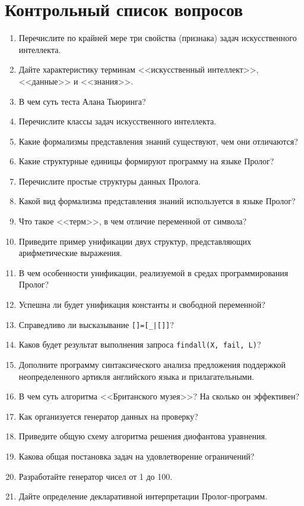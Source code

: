 \documentclass[12pt, openany, twoside]{book} %
\begin{document}
\chapter*{Контрольный список вопросов}
\begin{enumerate}
\item{} Перечислите по крайней мере три свойства (признака) задач искусственного интеллекта.
\item{} Дайте характеристику терминам <<искусственный интеллект>>, <<данные>> и <<знания>>.
\item{} В чем суть теста Алана Тьюринга?
\item{} Перечислите классы задач искусственного интеллекта.
\item{} Какие формализмы представления знаний существуют, чем они отличаются?
\item{} Какие структурные единицы формируют программу на языке Пролог?
\item{} Перечислите простые структуры данных Пролога.
\item{} Какой вид формализма представления знаний используется в языке Пролог?
\item{} Что такое <<терм>>, в чем отличие переменной от символа?
\item{} Приведите пример унификации двух структур, представляющих арифметические выражения.
\item{} В чем особенности унификации, реализуемой в средах программирования Пролог?
\item{} Успешна ли будет унификация константы и свободной переменной?
\item{} Справедливо ли высказывание \texttt{[]=[\_|[]]}?
\item{} Каков будет результат выполнения запроса \texttt{findall(X, fail, L)}?
\item{} Дополните программу синтаксического анализа предложения поддержкой неопределенного артикля английского языка и прилагательными.
\item{} В чем суть алгоритма <<Британского музея>>? На сколько он эффективен?
\item{} Как организуется генератор данных на проверку?
\item{} Приведите общую схему алгоритма решения диофантова уравнения.
\item{} Какова общая постановка задач на удовлетворение ограничений?
\item{} Разработайте генератор чисел от 1 до 100.
\item{} Дайте определение декларативной интерпретации Пролог-про\-грамм.

\end{enumerate}
\end{document}
